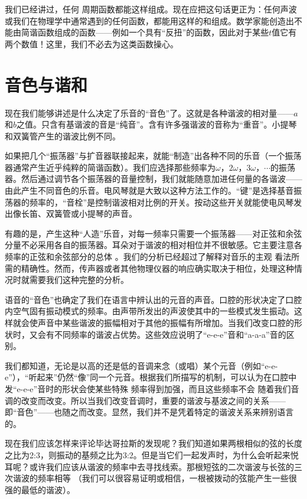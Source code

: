 我们已经讲过，任何 周期函数都能这样组成。现在应把这句话更正为：任何声波或我们在物理学中通常遇到的任何函数，都能用这样的和组成。数学家能创造出不能由简谐函数组成的函数——例如一个具有“反扭”的函数，因此对于某些$t$值它有两个数值！这里，我们不必去为这类函数操心。

\section{音色与谐和}

现在我们能够讲述是什么决定了乐音的“音色”了。这就是各种谐波的相对量——$a$和$b$之值。只含有基谐波的音是“纯音”。含有许多强谐波的音称为“重音”。小提琴和双簧管产生的谐波比例不同。

如果把几个“振荡器”与扩音器联接起来，就能“制造”出各种不同的乐音（一个振荡器通常产生近乎纯粹的简谐函数）。我们应选择那些频率为$\omega$，$2\omega$，$3\omega$，$\cdots$的振荡器。然后通过调节各个振荡器的音量控制，我们就能随意加进任何量的各谐波——由此产生不同音色的乐音。电风琴就是大致以这种方法工作的。“键”是选择基音振荡器的频率的，“音栓”是控制谐波相对比例的开关。按动这些开关就能使电风琴发出像长笛、双簧管或小提琴的声音。

有趣的是，产生这种“人造”乐音，对每一频率只需要一个振荡器——对正弦和余弦分量不必采用各自的振荡器。耳朵对于谐波的相对相位并不很敏感。它主要注意各频率的正弦和余弦部分的总体 。我们的分析已经超过了解释对音乐的主观 看法所需的精确性。然而，传声器或者其他物理仪器的响应确实取决于相位，处理这种情况时就需要我们这种完整的分析。

语音的“音色”也确定了我们在语言中辨认出的元音的声音。口腔的形状决定了口腔内空气固有振动模式的频率。由声带所发出的声波使其中的一些模式发生振动。这样就会使声音中某些谐波的振幅相对于其他的振幅有所增加。当我们改变口腔的形状时，又会有不同频率的谐波占优势。这些效应说明了“e-e-e”音和“a-a-a”音的区别。

我们都知道，无论是以高的还是低的音调来念（或唱）某个元音（例如“e-e-e”），“听起来”仍然“像”同一个元音。根据我们所描写的机制，可以认为在口腔中发“e-e-e”音时的形状会使某些特殊 频率得到加强，而且这些频率不会 随着我们音调的改变而改变。所以当我们改变音调时，重要的谐波与基波之间的关系——即“音色”——也随之而改变。显然，我们并不是凭着特定的谐波关系来辨别语言的。

现在我们应该怎样来评论毕达哥拉斯的发现呢？我们知道如果两根相似的弦的长度之比为2:3，则振动的基频之比为3:2。但是当它们一起发声时，为什么会听起来悦耳呢？或许我们应该从谐波的频率中去寻找线索。那根短弦的二次谐波与长弦的三次谐波的频率相等 （我们可以很容易证明或相信，一根被拨动的弦能产生一些很强的最低的谐波）。

